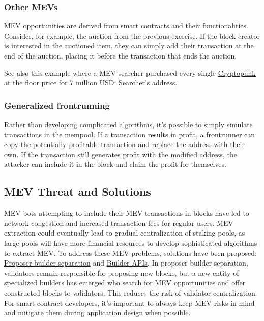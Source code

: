 \documentclass[12pt]{article}
\begin{document}
\subsubsection*{Other MEVs}
MEV opportunities are derived from smart contracts and their functionalities. Consider, for example, the auction from the previous exercise. If the block creator is interested in the auctioned item, they can simply add their transaction at the end of the auction, placing it before the transaction that ends the auction.

See also this example where a MEV searcher purchased every single \href{https://cryptopunks.app/}{Cryptopunk} at the floor price for 7 million USD: \href{https://etherscan.io/address/0x650dCdEB6ecF05aE3CAF30A70966E2F395d5E9E5}{Searcher's address}.

\subsubsection*{Generalized frontrunning}

Rather than developing complicated algorithms, it's possible to simply simulate transactions in the mempool. If a transaction results in profit, a frontrunner can copy the potentially profitable transaction and replace the address with their own. If the transaction still generates profit with the modified address, the attacker can include it in the block and claim the profit for themselves.

\subsection{MEV Threat and Solutions}

MEV bots attempting to include their MEV transactions in blocks have led to network congestion and increased transaction fees for regular users. MEV extraction could eventually lead to gradual centralization of staking pools, as large pools will have more financial resources to develop sophisticated algorithms to extract MEV. To address these MEV problems, solutions have been proposed: \href{https://ethereum.org/en/developers/docs/mev/#proposer-builder-separation}{Proposer-builder separation} and \href{https://ethereum.org/en/developers/docs/mev/#builder-api}{Builder APIs}. In proposer-builder separation, validators remain responsible for proposing new blocks, but a new entity of specialized builders has emerged who search for MEV opportunities and offer constructed blocks to validators. This reduces the risk of validator centralization. For smart contract developers, it's important to always keep MEV risks in mind and mitigate them during application design when possible.
\end{document}
